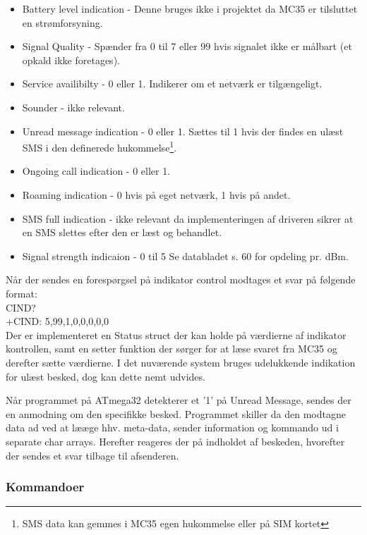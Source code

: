 \begin{itemize}
    \item Battery level indication - Denne bruges ikke i projektet da MC35 er tilsluttet en strømforsyning.
    \item Signal Quality - Spænder fra 0 til 7 eller 99 hvis signalet ikke er målbart (et opkald ikke foretages).
    \item Service availibilty - 0 eller 1. Indikerer om et netværk er tilgængeligt.
    \item Sounder  - ikke relevant.
    \item Unread message indication - 0 eller 1. Sættes til 1 hvis der findes en ulæst SMS i den 
    definerede hukommelse\footnote{SMS data kan gemmes i MC35 egen hukommelse eller på SIM kortet}.
    \item Ongoing call indication - 0 eller 1.
    \item Roaming indication - 0 hvis på eget netværk, 1 hvis på andet.
    \item SMS full indication - ikke relevant da implementeringen af driveren sikrer at en SMS slettes efter den er læst og behandlet.
    \item Signal strength indicaion - 0 til 5 Se databladet s. 60 for opdeling pr. dBm.
\end{itemize}

Når der sendes en forespørgsel på indikator control modtages et svar på følgende format:\\

	CIND?\\
	+CIND: 5,99,1,0,0,0,0,0\\

Der er implementeret en Status struct der kan holde på værdierne af indikator kontrollen, samt en setter funktion der sørger for at læse svaret fra MC35 og derefter sætte værdierne.
I det nuværende system bruges udelukkende indikation for ulæst besked, dog kan dette nemt udvides.

Når programmet på ATmega32 detekterer et '1' på Unread Message, sendes der en anmodning om den specifikke besked. Programmet skiller da den modtagne data ad ved at lææge hhv. meta-data, sender information og kommando 
ud i separate char arrays. Herefter reageres der på indholdet af beskeden, hvorefter der sendes et svar tilbage til afsenderen.

\subsubsection{Kommandoer}

